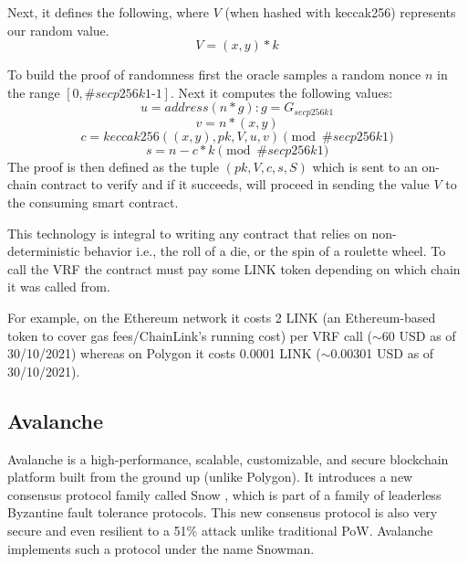 \documentclass[10pt,journal,compsoc]{IEEEtran}
\begin{document}
Next, it defines the following, where $V$ (when hashed with keccak256) represents our random value. 
\begin{equation}
    V = (x, y) * k
\end{equation}

To build the proof of randomness first the oracle samples a random nonce $n$ in the range $[0, \textit{\#secp256k1-1}]$. Next it computes the following values:
\begin{equation}
    u = \textit{address}(n * g) : g = G_{\textit{secp256k1}}
\end{equation}
\begin{equation}
    v = n * (x, y)
\end{equation}
\begin{equation}
    c = \textit{keccak256}((x, y), pk, V, u, v) \pmod{\textit{\#secp256k1}} 
\end{equation}
\begin{equation}
    s = n - c * k \pmod{\textit{\#secp256k1}} 
\end{equation}
The proof is then defined as the tuple $(pk, V, c, s, S)$ which is sent to an on-chain contract to verify and if it succeeds, will proceed in sending the value $V$ to the consuming smart contract.

This technology is integral to writing any contract that relies on non-deterministic behavior i.e., the roll of a die, or the spin of a roulette wheel. To call the VRF the contract must pay some LINK token depending on which chain it was called from. 

For example, on the Ethereum network it costs 2 LINK (an Ethereum-based token to cover gas fees/ChainLink’s running cost) per VRF call ($\sim$60 USD as of 30/10/2021) whereas on Polygon it costs 0.0001 LINK ($\sim$0.00301 USD as of 30/10/2021). 

\subsection{Avalanche}
Avalanche is a high-performance, scalable, customizable, and secure blockchain platform \cite{Sekniqi2020} built from the ground up (unlike Polygon). It introduces a new consensus protocol family called Snow \cite{Rocket2019}, which is part of a family of leaderless Byzantine fault tolerance protocols. This new consensus protocol is also very secure and even resilient to a 51\% attack unlike traditional PoW. Avalanche implements such a protocol under the name Snowman.
\end{document}
